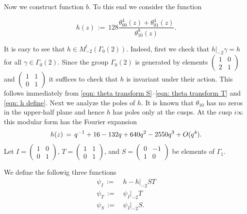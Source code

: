   Now we construct function $b$. To this end we consider the function
  \begin{definition}\label{def: h}
  \begin{equation}\label{eqn: h define}
    h(z)\,:=\,128 \frac{\theta_{00}^4(z)+\theta_{01}^4(z)}{\theta_{10}^8(z)}.
  \end{equation}
  \end{definition}
  It is easy to see that $h\in M^!_{-2}(\Gamma_0(2))$. Indeed, first we check that $h|_{-2}\gamma=h$
  for all $\gamma\in\Gamma_0(2)$. Since the group $\Gamma_0(2)$ is generated by elements
  $\left(\begin{smallmatrix}1&0\\2&1\end{smallmatrix}\right)$ and $\left(\begin{smallmatrix}1&1\\0&1\end{smallmatrix}\right)$
  it suffices to check that $h$ is invariant under their action. This follows immediately
  from \eqref{eqn: theta transform S}--\eqref{eqn: theta transform T} and \eqref{eqn: h define}. Next we analyze the poles of $h$.
  It is known \cite[Chapter~I Lemma~4.1]{Mumford} that $\theta_{10}$ has no zeros in the upper-half plane and hence $h$ has poles only at the cusps.
  At the cusp $i\infty$ this modular form has the Fourier expansion
  \begin{equation}
  h(z)\,=\,q^{-1} + 16 - 132 q + 640 q^2 - 2550 q^3+O(q^4).\notag
  \end{equation}
  Let $I=\left(\begin{smallmatrix}1&0\\0&1\end{smallmatrix}\right)$,
  $T=\left(\begin{smallmatrix}1&1\\0&1\end{smallmatrix}\right)$, and
  $S=\left(\begin{smallmatrix}0&-1\\1&0\end{smallmatrix}\right)$ be elements of $\Gamma_1$.
  \begin{definition}\label{def: psi I psi T psi S}
  We define the followig three functions
  \begin{align}
    \psi_I\,:=\,&h-h|_{-2}ST \label{eqn: psi I define}\\
    \psi_T\,:=\,&\psi_I|_{-2}T \label{eqn: psi T define}\\
    \psi_S\,:=\,&\psi_I|_{-2}S. \label{eqn: psi S define}
  \end{align}
  \end{definition}
